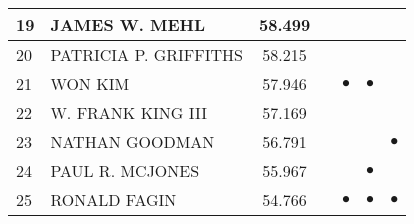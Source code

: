 \documentclass[12pt,titlepage]{report}
\begin{document}
\begin{center}
\begin{tabular}{|l|l|c|c|c|c|c|}
\hline
19 & JAMES W. MEHL & 58.499         &           &           &           &           \\
\hline
20 & PATRICIA P. GRIFFITHS & 58.215 &           &           &           &           \\
\hline
21 & WON KIM & 57.946               &           & $\bullet$ & $\bullet$ &           \\
\hline
22 & W. FRANK KING III & 57.169     &           &           &           &           \\
\hline
23 & NATHAN GOODMAN & 56.791        &           &           &           & $\bullet$ \\
\hline
24 & PAUL R. MCJONES & 55.967       &           &           & $\bullet$ &           \\
\hline
25 & RONALD FAGIN & 54.766          &           & $\bullet$ & $\bullet$ & $\bullet$ \\
\hline
\end{tabular}
\end{center}
\end{document}
